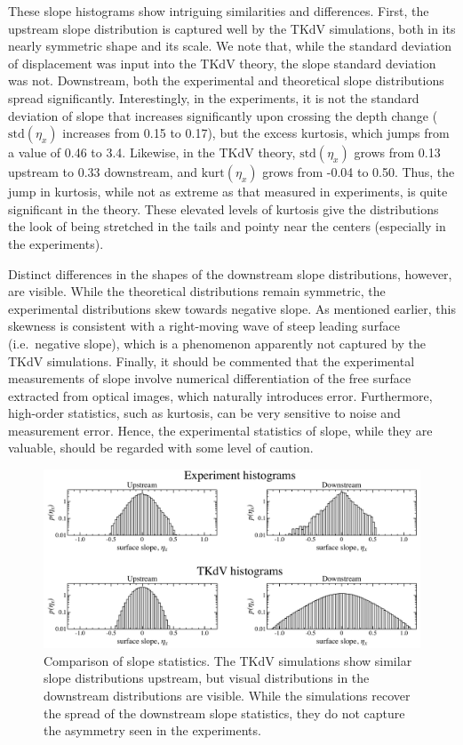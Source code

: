 \documentclass[11pt]{article}
\newcommand{\kurt}{\text{kurt}}
\newcommand{\std}{\text{std}}
\begin{document}
	These slope histograms show intriguing similarities and differences. First, the upstream slope distribution is captured well by the TKdV simulations, both in its nearly symmetric shape and its scale. We note that, while the standard deviation of displacement was input into the TKdV theory, the slope standard deviation was not. Downstream, both the experimental and theoretical slope distributions  spread significantly. Interestingly, in the experiments, it is not the standard deviation of slope that increases significantly upon crossing the depth change ($\std(\eta_x)$ increases from 0.15 to 0.17), but the excess kurtosis, which jumps from a value of 0.46 to 3.4. Likewise, in the TKdV theory, $\std(\eta_x)$ grows from 0.13 upstream to 0.33 downstream, and $\kurt(\eta_x)$ grows from -0.04 to 0.50. Thus, the jump in kurtosis, while not as extreme as that measured in experiments, is quite significant in the theory. These elevated levels of kurtosis give the distributions the look of being stretched in the tails and pointy near the centers (especially in the experiments).

	Distinct differences in the shapes of the downstream slope distributions, however, are visible. While the theoretical distributions remain symmetric, the experimental distributions skew towards negative slope. As mentioned earlier, this skewness is consistent with a right-moving wave of steep leading surface (i.e.~negative slope), which is a phenomenon apparently not captured by the TKdV simulations.
Finally, it should be commented that the experimental measurements of slope involve numerical differentiation of the free surface extracted from optical images, which naturally introduces error. Furthermore, high-order statistics, such as kurtosis, can be very sensitive to noise and measurement error. Hence, the experimental statistics of slope, while they are valuable, should be regarded with some level of caution.

\begin{figure}%
\begin{center}
\includegraphics[width = 0.99 \linewidth]{Figs/slopehist.pdf}
\caption{
Comparison of slope statistics. The TKdV simulations show similar slope distributions upstream, but visual distributions in the downstream distributions are visible. While the simulations recover the spread of the downstream slope statistics, they do not capture the asymmetry seen in the experiments.
}
\label{slopehist}
\end{center}
\end{figure}
\end{document}
